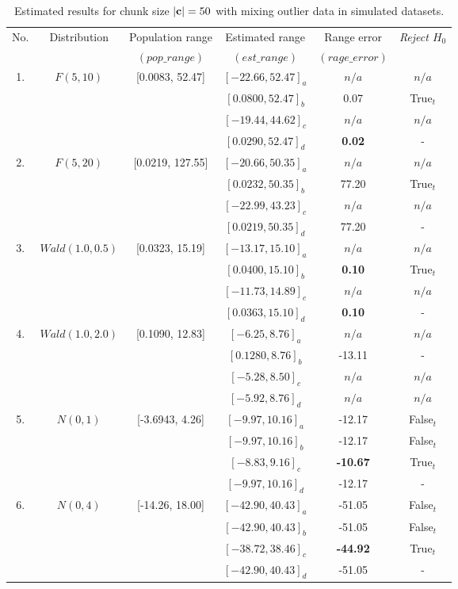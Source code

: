 \documentclass[a4paper,fleqn]{cas-dc}
\begin{document}
\begin{table}[h!]
\centering
\caption{Estimated results for chunk size $|{\bf c}|=50$ with mixing outlier data in simulated datasets.}
\label{tab:res_sim50_noise}
\begin{threeparttable}
\begin{tabular}{|c|c|c|c|c|c|}
\hline
\multirow{2}{*}{No.} & \multirow{2}{*}{Distribution} & Population range & 
Estimated range&Range error& \multirow{2}{*}{\it{Reject} $H_0$} \\
&&$(pop\_range)$&$(est\_range)$&$(rage\_error)$& \\
\hline
\multirow{4}{*}{1.} & \multirow{4}{*}{$F(5 ,10)$}&\multirow{4}{*}{[0.0083, 52.47]} & $[-22.66, 52.47]_a$& 
    $n/a$ & $n/a$\\
&&&$[0.0800, 52.47]_b$ & 0.07 & True$_t$\\
&&&$[-19.44, 44.62]_c$ & $n/a$ & $n/a$\\
&&&$[0.0290, 52.47]_d$ & \bf{0.02} & - \\
\hline
\multirow{4}{*}{2.} & \multirow{4}{*}{$F(5 ,20)$}&\multirow{4}{*}{[0.0219, 127.55]} & $[-20.66, 50.35]_a$& 
    $n/a$ & $n/a$\\
    &&&$[0.0232, 50.35]_b$ & 77.20 & True$_t$\\
    &&&$[-22.99, 43.23]_c$ & $n/a$ & $n/a$ \\
    &&&$[0.0219, 50.35]_d$ & 77.20 & -  \\
\hline
\multirow{4}{*}{3.} & \multirow{4}{*}{$Wald(1.0 ,0.5)$}&\multirow{4}{*}{[0.0323, 15.19]} & 
$[-13.17, 15.10]_a$& 
    $n/a$ & $n/a$\\
    &&&$[0.0400, 15.10]_b$ & \bf{0.10} & True$_t$\\
    &&&$[-11.73, 14.89]_c$ & $n/a$ & $n/a$\\
    &&&$[0.0363, 15.10]_d$ & \bf{0.10} &- \\

\hline
\multirow{4}{*}{4.} & \multirow{4}{*}{$Wald(1.0 ,2.0)$}&\multirow{4}{*}{[0.1090, 12.83]} & 
$[-6.25, 8.76]_a$& 
     $n/a$ & $n/a$ \\
    &&&$[0.1280, 8.76]_b$ & -13.11 & -\\
    &&&$[-5.28, 8.50]_c$ & $n/a$ & $n/a$\\
    &&&$[-5.92, 8.76]_d$& $n/a$ & $n/a$\\    
\hline
\multirow{4}{*}{5.} & \multirow{4}{*}{$N(0 ,1)$}&\multirow{4}{*}{[-3.6943, 4.26]} & $[-9.97, 10.16]_a$& 
    -12.17 & False$_t$\\
    &&&$[-9.97, 10.16]_b$ & -12.17 & False$_t$\\
    &&&$[-8.83, 9.16]_c$ & \bf{-10.67}      &True$_t$\\
    &&&$[-9.97, 10.16]_d$ & -12.17 &  - \\   
\hline     
\multirow{4}{*}{6.} & \multirow{4}{*}{$N(0 ,4)$}&\multirow{4}{*}{[-14.26, 18.00]} & $[-42.90, 40.43]_a$& 
    -51.05 & False$_t$\\
    &&&$[-42.90, 40.43]_b$ & -51.05 & False$_t$\\
    &&&$[-38.72, 38.46]_c$ & \bf{-44.92}      & True$_t$\\
    &&&$[-42.90, 40.43]_d$ & -51.05 & - \\


\end{tabular}
\end{threeparttable}
\end{table}
\end{document}
